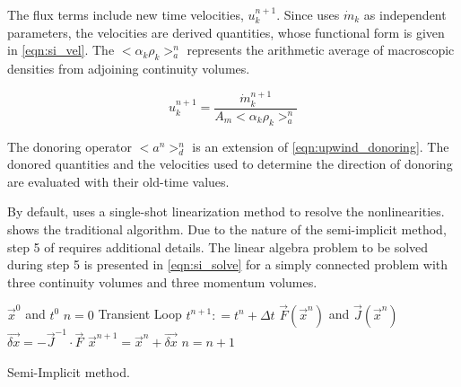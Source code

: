 The flux terms include new time velocities, $u^{n+1}_k$.
Since \cobra{} uses $\dot{m}_{k}$ as independent parameters, the velocities are derived quantities, whose functional form is given in \eqref{eqn:si_vel}.
The $<\alpha_k \rho_k>^{n}_{a}$ represents the arithmetic average of macroscopic densities from adjoining continuity volumes.

\begin{equation}
\label{eqn:si_vel}
u^{n+1}_k = \frac{\dot{m}^{n+1}_k}{A_m <\alpha_k \rho_k>^{n}_{a}} 
\end{equation}

The donoring operator $<a^n>^{n}_{d}$ is an extension of \eqref{eqn:upwind_donoring}.
The donored quantities and the velocities used to determine the direction of donoring are evaluated with their old-time values.

By default, \cobra{} uses a single-shot linearization method to resolve the nonlinearities.
 shows the traditional algorithm.
Due to the nature of the semi-implicit method, step 5 of  requires additional details.
The linear algebra problem to be solved during step 5 is presented in \eqref{eqn:si_solve} for a simply connected problem with three continuity volumes and three momentum volumes.

\begin{algo}[H]
\setlength{\baselineskip}{0.625\baselineskip}
\begin{algorithmic}[1]
\Require $\vec{x}^{0}$ and $t^{0}$
\Set $n = 0$
\Loop \; Transient Loop
    \State $t^{n+1} : = t^{n} + \Delta t$
	\Calculate $\vec{F}(\vec{x}^{n})$ and $\vec{J}(\vec{x}^{n})$
	\BlackBox $\vec{\delta x} = - \vec{J}^{-1}\cdot\vec{F}$
	\Calculate $\vec{x}^{n+1} = \vec{x}^{n} + \vec{\delta x}$
	\State $n = n + 1$
\EndLoop
\end{algorithmic}
\caption{\cobra{} Semi-Implicit method.}
\label{alg:si_legacy}
\end{algo}


